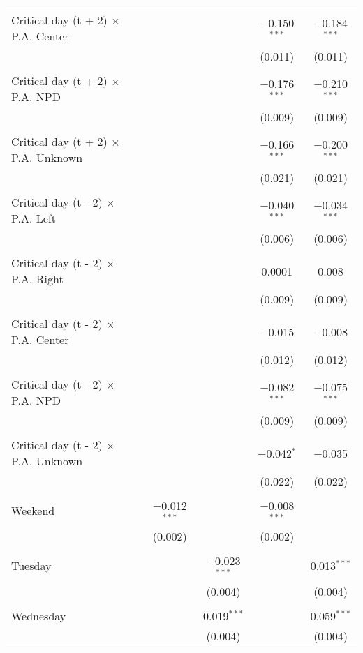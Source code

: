 \documentclass[
]{article}
\begin{document}
\begin{table}[!htbp]
{\begin{tabular}{@{\extracolsep{5pt}}lcccc}
  & & & & \\ 
 Critical day (t + 2) $\times$ P.A. Center &  &  & $-$0.150$^{***}$ & $-$0.184$^{***}$ \\ 
  &  &  & (0.011) & (0.011) \\ 
  & & & & \\ 
 Critical day (t + 2) $\times$ P.A. NPD &  &  & $-$0.176$^{***}$ & $-$0.210$^{***}$ \\ 
  &  &  & (0.009) & (0.009) \\ 
  & & & & \\ 
 Critical day (t + 2) $\times$ P.A. Unknown &  &  & $-$0.166$^{***}$ & $-$0.200$^{***}$ \\ 
  &  &  & (0.021) & (0.021) \\ 
  & & & & \\ 
 Critical day (t - 2) $\times$ P.A. Left &  &  & $-$0.040$^{***}$ & $-$0.034$^{***}$ \\ 
  &  &  & (0.006) & (0.006) \\ 
  & & & & \\ 
 Critical day (t - 2) $\times$ P.A. Right &  &  & 0.0001 & 0.008 \\ 
  &  &  & (0.009) & (0.009) \\ 
  & & & & \\ 
 Critical day (t - 2) $\times$ P.A. Center &  &  & $-$0.015 & $-$0.008 \\ 
  &  &  & (0.012) & (0.012) \\ 
  & & & & \\ 
 Critical day (t - 2) $\times$ P.A. NPD &  &  & $-$0.082$^{***}$ & $-$0.075$^{***}$ \\ 
  &  &  & (0.009) & (0.009) \\ 
  & & & & \\ 
 Critical day (t - 2) $\times$ P.A. Unknown &  &  & $-$0.042$^{*}$ & $-$0.035 \\ 
  &  &  & (0.022) & (0.022) \\ 
  & & & & \\ 
 Weekend & $-$0.012$^{***}$ &  & $-$0.008$^{***}$ &  \\ 
  & (0.002) &  & (0.002) &  \\ 
  & & & & \\ 
 Tuesday &  & $-$0.023$^{***}$ &  & 0.013$^{***}$ \\ 
  &  & (0.004) &  & (0.004) \\ 
  & & & & \\ 
 Wednesday &  & 0.019$^{***}$ &  & 0.059$^{***}$ \\ 
  &  & (0.004) &  & (0.004) \\ 

\end{tabular}}
\end{table}
\end{document}
